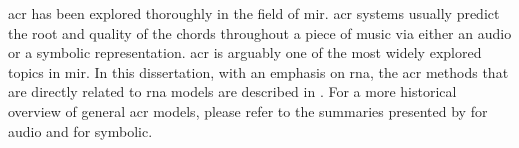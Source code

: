 

\gls{acr} has been explored thoroughly in the field of
\gls{mir}. \gls{acr} systems usually predict the root and
quality of the chords throughout a piece of music via either
an audio or a symbolic representation. \gls{acr} is arguably
one of the most widely explored topics in \gls{mir}. In this
dissertation, with an emphasis on \gls{rna}, the \gls{acr}
methods that are directly related to \gls{rna} models are
described in . For
a more historical overview of general \gls{acr} models,
please refer to the summaries presented by
\textcite{pauwels201920} for audio and \textcite[p.
58--88]{ju2021addressing} for symbolic.
